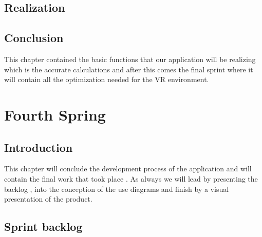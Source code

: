 \documentclass[]{report}
\begin{document}
\section{Realization}


\section{Conclusion}

This chapter contained the basic functions that our application will be realizing which is the accurate calculations and after this comes the final sprint where it will contain all the optimization needed for the VR environment.


\chapter{Fourth Spring}
\section{Introduction}
This chapter will conclude the development process of the application and will contain the final work that took place . As always we will lead by presenting the backlog , into the conception of the use diagrams and finish by a visual presentation of the product.
\section{Sprint backlog}
\end{document}
